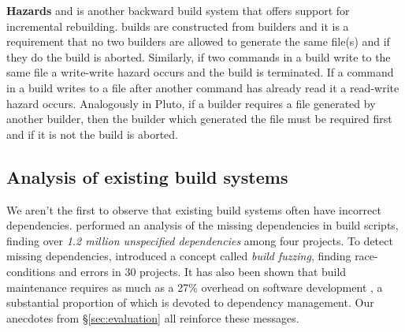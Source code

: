 \textbf{Hazards} \Pluto and \PIE \cite{} is another backward build system that offers support for incremental rebuilding. \Pluto builds are constructed from builders and it is a requirement that no two builders are allowed to generate the same file(s) and if they do the build is aborted.  Similarly, if two commands in a \Rattle build write to the same file a write-write hazard occurs and the build is terminated.  If a command in a \Rattle build writes to a file after another command has already read it a read-write hazard occurs.  Analogously in Pluto, if a builder requires a file generated by another builder, then the builder which generated the file must be required first and if it is not the build is aborted.

%

\subsection{Analysis of existing build systems}

We aren't the first to observe that existing build systems often have incorrect dependencies.  \citet{bezemer2017empirical} performed an analysis of the missing dependencies in \Make build scripts, finding over \emph{1.2 million unspecified dependencies} among four projects. To detect missing dependencies, \citet{detecting_incorrect_build_rules} introduced a concept called \emph{build fuzzing}, finding race-conditions and errors in 30 projects. It has also been shown that build maintenance requires as much as a 27\% overhead on software development \cite{build_maintenance}, a substantial proportion of which is devoted to dependency management. Our anecdotes from \S\ref{sec:evaluation} all reinforce these messages.

